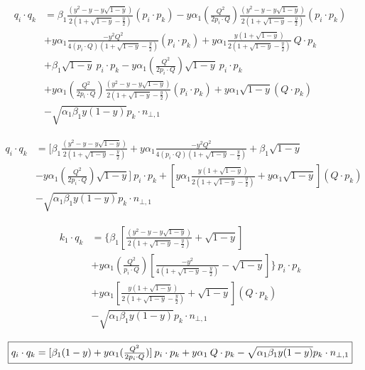 \begin{equation}
	\begin{aligned}
	q_i \cdot q_k &= \beta_1 \frac{(y^2 -y-y\sqrt{1-y}) }{2(1+\sqrt{1-y}-\frac{y}{2})}(p_{i}\cdot {p_k})
	-y\alpha_1(\frac{Q^2}{2p_i \cdot Q})\frac{(y^2 -y-y\sqrt{1-y})}{2(1+\sqrt{1-y}-\frac{y}{2})}(p_{i}\cdot {p_k})\\
&+y\alpha_1\frac{-y^2 Q^2 }{4(p_i\cdot Q)(1+\sqrt{1-y}-\frac{y}{2})}(p_{i}\cdot {p_k})+ y\alpha_1\frac{y(1+\sqrt{1-y})}{2(1+\sqrt{1-y}-\frac{y}{2})}\:Q \cdot p_k\\
	&+\beta_1 \sqrt{1-y}\:p_i \cdot p_k-y\alpha_1(\frac{Q^2}{2p_i \cdot Q})\sqrt{1-y}\:p_i \cdot p_k\\
	&+y\alpha_1(\frac{Q^2}{2p_i \cdot Q})\frac{(y^2 -y-y\sqrt{1-y})}{2(1+\sqrt{1-y}-\frac{y}{2})}(p_{i}\cdot {p_k})+y\alpha_1\sqrt{1-y}(Q\cdot p_k)\\
	&-\sqrt{\alpha_1\beta_1y(1-y)} p_k \cdot {n_{\bot,1}} 
    \end{aligned}
\end{equation}

\begin{equation}
	\begin{aligned}
	q_i \cdot q_k &= [\beta_1 \frac{(y^2 -y-y\sqrt{1-y}) }{2(1+\sqrt{1-y}-\frac{y}{2})}+y\alpha_1\frac{-y^2 Q^2 }{4(p_i\cdot Q)(1+\sqrt{1-y}-\frac{y}{2})}+\beta_1 \sqrt{1-y}\\&-y\alpha_1(\frac{Q^2}{2p_i \cdot Q})\sqrt{1-y}]\:p_i \cdot p_k+[y\alpha_1\frac{y(1+\sqrt{1-y})}{2(1+\sqrt{1-y}-\frac{y}{2})}+y\alpha_1\sqrt{1-y}](Q\cdot p_k)\\
	&-\sqrt{\alpha_1\beta_1y(1-y)} p_k \cdot {n_{\bot,1}} 
    \end{aligned}
\end{equation}

\begin{equation}
	\begin{aligned}
	k_1 \cdot q_k &= \lbrace\beta_1 [\frac{(y^2 -y-y\sqrt{1-y}) }{2(1+\sqrt{1-y}-\frac{y}{2})}+ \sqrt{1-y}]\\
	&+y\alpha_1(\frac{Q^2}{p_i \cdot Q})[\frac{-y^2 }{4(1+\sqrt{1-y}-\frac{y}{2})}-\sqrt{1-y}]\rbrace\:p_i \cdot p_k\\
	&+y\alpha_1[\frac{y(1+\sqrt{1-y})}{2(1+\sqrt{1-y}-\frac{y}{2})}+\sqrt{1-y}](Q\cdot p_k)\\
	&-\sqrt{\alpha_1\beta_1y(1-y)} p_k \cdot {n_{\bot,1}} 
    \end{aligned}
\end{equation}

\begin{equation}
	\begin{aligned}
		\fbox{$  q_i \cdot q_k = [\beta_1 (1-y)+y\alpha_1(\frac{Q^2}{2p_i \cdot Q})]\:p_i \cdot p_k+y\alpha_1\:Q\cdot p_k-\sqrt{\alpha_1\beta_1y(1-y)} p_k \cdot {n_{\bot,1}} $}
    \end{aligned}
\end{equation}